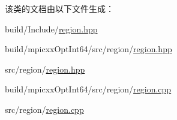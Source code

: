 该类的文档由以下文件生成：\begin{DoxyCompactItemize}
\item 
build/Include/\hyperlink{build_2Include_2region_8hpp}{region.hpp}\item 
build/mpicxxOptInt64/src/region/\hyperlink{build_2mpicxxOptInt64_2src_2region_2region_8hpp}{region.hpp}\item 
src/region/\hyperlink{src_2region_2region_8hpp}{region.hpp}\item 
build/mpicxxOptInt64/src/region/\hyperlink{build_2mpicxxOptInt64_2src_2region_2region_8cpp}{region.cpp}\item 
src/region/\hyperlink{src_2region_2region_8cpp}{region.cpp}\end{DoxyCompactItemize}
